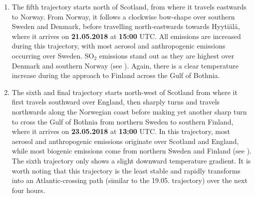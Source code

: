 \begin{enumerate}
    \item The fifth trajectory starts north of Scotland, from where it travels eastwards to Norway. From Norway, it follows a clockwise bow-shape over southern Sweden and Denmark, before travelling north-eastwards towards Hyyti\"al\"a, where it arrives on \textbf{21.05.2018} at \textbf{15:00} UTC. All emissions are increased during this trajectory, with most aerosol and anthropogenic emissions occurring over Sweden. $\text{SO}_2$ emissions stand out as they are highest over Denmark and southern Norway (see ). Again, there is a clear temperature increase during the approach to Finland across the Gulf of Bothnia.
    \item The sixth and final trajectory starts north-west of Scotland from where it first travels southward over England, then sharply turns and travels northwards along the Norwegian coast before making yet another sharp turn to cross the Gulf of Bothnia from northern Sweden to southern Finland, where it arrives on \textbf{23.05.2018} at \textbf{13:00} UTC. In this trajectory, most aerosol and anthropogenic emissions originate over Scotland and England, while most biogenic emissions come from northern Sweden and Finland (see ). The sixth trajectory only shows a slight downward temperature gradient. It is worth noting that this trajectory is the least stable and rapidly transforms into an Atlantic-crossing path (similar to the 19.05. trajectory) over the next four hours.
\end{enumerate}

